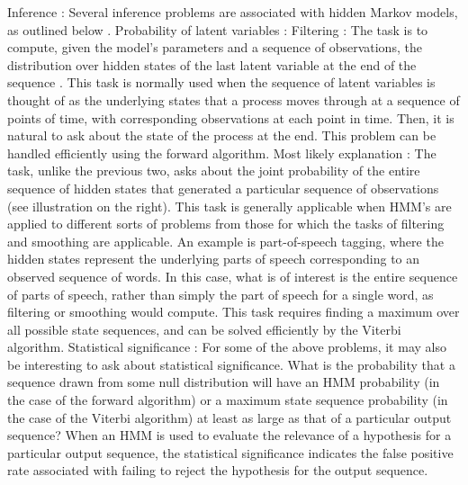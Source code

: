 \documentclass{article}
\begin{document}
Inference :
Several inference problems are associated with hidden Markov models, as outlined below .
Probability of latent variables :
Filtering :
The task is to compute, given the model's parameters and a sequence of observations, the 
distribution over hidden states of the last latent variable at the end of the sequence . This 
task is normally used when the sequence of latent variables is thought of as the underlying 
states that a process moves through at a sequence of points of time, with corresponding 
observations at each point in time. Then, it is natural to ask about the state of the process at 
the end. 
This problem can be handled efficiently using the forward algorithm.
Most likely explanation :
The task, unlike the previous two, asks about the joint probability of the entire sequence of 
hidden states that generated a particular sequence of observations (see illustration on the 
right). This task is generally applicable when HMM's are applied to different sorts of 
problems from those for which the tasks of filtering and smoothing are applicable. An 
example is part-of-speech tagging, where the hidden states represent the underlying parts 
of speech corresponding to an observed sequence of words. In this case, what is of interest 
is the entire sequence of parts of speech, rather than simply the part of speech for a single 
word, as filtering or smoothing would compute. This task requires finding a maximum over 
all possible state sequences, and can be solved efficiently by the Viterbi algorithm.
Statistical significance :
For some of the above problems, it may also be interesting to ask about statistical 
significance. What is the probability that a sequence drawn from some null distribution will 
have an HMM probability (in the case of the forward algorithm) or a maximum state 
sequence probability (in the case of the Viterbi algorithm) at least as large as that of a
particular output sequence? When an HMM is used to evaluate the relevance of a 
hypothesis for a particular output sequence, the statistical significance indicates the false 
positive rate associated with failing to reject the hypothesis for the output sequence.
\end{document}
